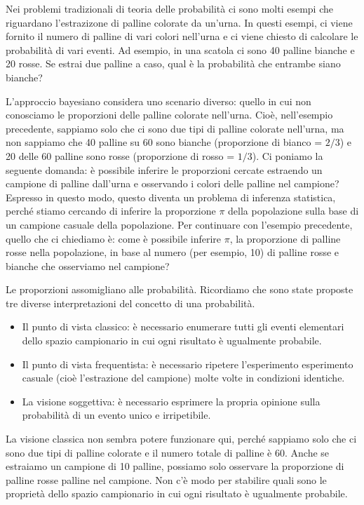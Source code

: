 \documentclass[
  11pt,
]{krantz}
\providecommand{\tightlist}{%
  \setlength{\itemsep}{0pt}\setlength{\parskip}{0pt}}
\theoremstyle{definition}
\theoremstyle{definition}
\theoremstyle{definition}
\theoremstyle{definition}
\theoremstyle{remark}
\begin{document}
Nei problemi tradizionali di teoria delle probabilità ci sono molti esempi che riguardano l'estrazizone di palline colorate da un'urna. In questi esempi, ci viene fornito il numero di palline di vari colori nell'urna e ci viene chiesto di calcolare le probabilità di vari eventi. Ad esempio, in una scatola ci sono 40 palline bianche e 20 rosse. Se estrai due palline a caso, qual è la probabilità che entrambe siano bianche?

L'approccio bayesiano considera uno scenario diverso: quello in cui non conosciamo le proporzioni delle palline colorate nell'urna. Cioè, nell'esempio precedente, sappiamo solo che ci sono due tipi di palline colorate nell'urna, ma non sappiamo che 40 palline su 60 sono bianche (proporzione di bianco = \(2/3\)) e 20 delle 60 palline sono rosse (proporzione di rosso = \(1/3\)). Ci poniamo la seguente domanda: è possibile inferire le proporzioni cercate estraendo un campione di palline dall'urna e osservando i colori delle palline nel campione? Espresso in questo modo, questo diventa un problema di inferenza statistica, perché stiamo cercando di inferire la proporzione \(\pi\) della popolazione sulla base di un campione casuale della popolazione. Per continuare con l'esempio precedente, quello che ci chiediamo è: come è possibile inferire \(\pi\), la proporzione di palline rosse nella popolazione, in base al numero (per esempio, 10) di palline rosse e bianche che osserviamo nel campione?

Le proporzioni assomigliano alle probabilità. Ricordiamo che sono state proposte tre diverse interpretazioni del concetto di una probabilità.

\begin{itemize}
\tightlist
\item
  Il punto di vista classico: è necessario enumerare tutti gli eventi elementari dello spazio campionario in cui ogni risultato è ugualmente probabile.
\item
  Il punto di vista frequentista: è necessario ripetere l'esperimento esperimento casuale (cioè l'estrazione del campione) molte volte in condizioni identiche.
\item
  La visione soggettiva: è necessario esprimere la propria opinione sulla probabilità di un evento unico e irripetibile.
\end{itemize}

La visione classica non sembra potere funzionare qui, perché sappiamo solo che ci sono due tipi di palline colorate e il numero totale di palline è 60. Anche se estraiamo un campione di 10 palline, possiamo solo osservare la proporzione di palline rosse palline nel campione. Non c'è modo per stabilire quali sono le proprietà dello spazio campionario in cui ogni risultato è ugualmente probabile.
\end{document}
